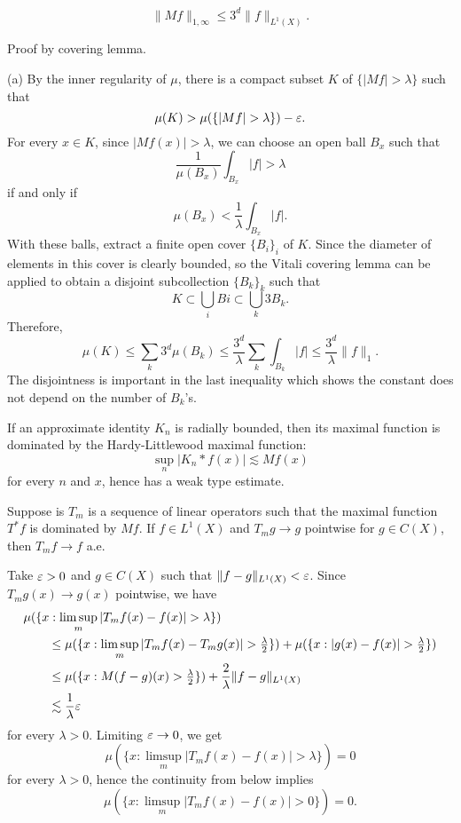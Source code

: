\documentclass{../../large}
\begin{document}
\begin{prb}
\[\|Mf\|_{1,\infty}\le 3^d\|f\|_{L^1(X)}.\]
\begin{parts}
\item Proof by covering lemma.
\end{parts}
\end{prb}
\begin{pf}
(a)
By the inner regularity of $\mu$, there is a compact subset $K$ of $\{|Mf|>\lambda\}$ such that
\[\mu(K)>\mu(\{|Mf|>\lambda\})-\e.\]
For every $x\in K$, since $|Mf(x)|>\lambda$, we can choose an open ball $B_x$ such that
\[\frac1{\mu(B_x)}\int_{B_x}|f|>\lambda\]
if and only if
\[\mu(B_x)<\frac1\lambda\int_{B_x}|f|.\]
With these balls, extract a finite open cover $\{B_i\}_i$ of $K$.
Since the diameter of elements in this cover is clearly bounded, so the Vitali covering lemma can be applied to obtain a disjoint subcollection $\{B_k\}_k$ such that
\[K\subset\bigcup_iBi\subset\bigcup_k3B_k.\]
Therefore,
\[\mu(K)
\le\sum_k3^d\mu(B_k)
\le\frac{3^d}\lambda\sum_k\int_{B_k}|f|
\le\frac{3^d}\lambda\|f\|_1.\]
The disjointness is important in the last inequality which shows the constant does not depend on the number of $B_k$'s.
\end{pf}



\begin{prb}
If an approximate identity $K_n$ is radially bounded, then its maximal function is dominated by the Hardy-Littlewood maximal function:
\[\sup_n|K_n*f(x)|\lesssim Mf(x)\]
for every $n$ and $x$, hence has a weak type estimate.
\end{prb}


\begin{prb}
Suppose is $T_m$ is a sequence of linear operators such that the maximal function $T^*f$ is dominated by $Mf$.
If $f\in L^1(X)$ and $T_mg\to g$ pointwise for $g\in C(X)$, then $T_mf\to f$ a.e.
\end{prb}
\begin{pf}
Take $\varepsilon>0$ and $g\in C(X)$ such that $\|f-g\|_{L^1(X)}<\varepsilon$.
Since $T_mg(x)\to g(x)$ pointwise, we have
\begin{align*}
&\mu(\{x:\limsup_m|T_mf(x)-f(x)|>\lambda\})\\
&\qquad\le\mu(\{x:\limsup_m|T_mf(x)-T_mg(x)|>\tfrac\lambda2\})
+\mu(\{x:|g(x)-f(x)|>\tfrac\lambda2\})\\
&\qquad\le\mu(\{x:M(f-g)(x)>\tfrac\lambda2\})+\frac2\lambda\|f-g\|_{L^1(X)}\\
&\qquad\lesssim\frac1\lambda\e
\end{align*}
for every $\lambda>0$.
Limiting $\varepsilon\to0$, we get
\[\mu(\{x:\limsup_m|T_mf(x)-f(x)|>\lambda\})=0\]
for every $\lambda>0$, hence the continuity from below implies
\[\mu(\{x:\limsup_m|T_mf(x)-f(x)|>0\})=0.\]
\end{pf}
\end{document}
